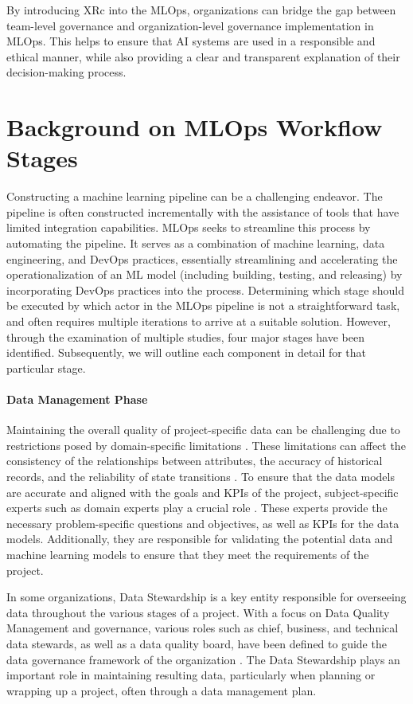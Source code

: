 \documentclass[conference]{IEEEtran}
\begin{document}
By introducing XRc into the MLOps, organizations can bridge the gap between team-level governance and organization-level governance implementation in MLOps. This helps to ensure that AI systems are used in a responsible and ethical manner, while also providing a clear and transparent explanation of their decision-making process.

\section{Background on MLOps Workflow Stages}
Constructing a machine learning pipeline can be a challenging endeavor. The pipeline is often constructed incrementally with the assistance of tools that have limited integration capabilities. MLOps seeks to streamline this process by automating the pipeline. It serves as a combination of machine learning, data engineering, and DevOps practices, essentially streamlining and accelerating the operationalization of an ML model (including building, testing, and releasing) by incorporating DevOps practices into the process. Determining which stage should be executed by which actor in the MLOps pipeline is not a straightforward task, and often requires multiple iterations to arrive at a suitable solution. However, through the examination of multiple studies, four major stages have been identified. Subsequently, we will outline each component in detail for that particular stage.
\paragraph{Data Management Phase} Maintaining the overall quality of project-specific data can be challenging due to restrictions posed by domain-specific limitations \cite{maydanchik2007data}. These limitations can affect the consistency of the relationships between attributes, the accuracy of historical records, and the reliability of state transitions \cite{taleb2018big}. To ensure that the data models are accurate and aligned with the goals and KPIs of the project, subject-specific experts such as domain experts play a crucial role . These experts provide the necessary problem-specific questions and objectives, as well as KPIs for the data models. Additionally, they are responsible for validating the potential data and machine learning models to ensure that they meet the requirements of the project.

In some organizations, Data Stewardship is a key entity responsible for overseeing data throughout the various stages of a project. With a focus on Data Quality Management and governance, various roles such as chief, business, and technical data stewards, as well as a data quality board, have been defined to guide the data governance framework of the organization \cite{mons2018data}. The Data Stewardship plays an important role in maintaining resulting data, particularly when planning or wrapping up a project, often through a data management plan.
\end{document}
